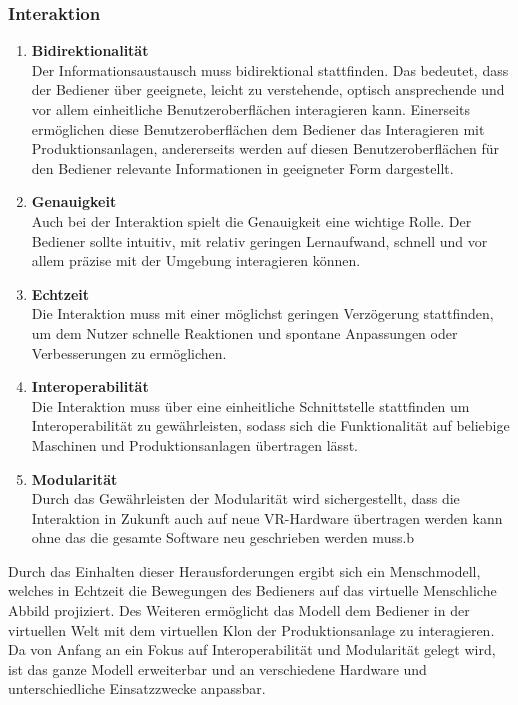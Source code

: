 \subsubsection{Interaktion}
\begin{enumerate}
	\item \textbf{Bidirektionalität} \\
	Der Informationsaustausch muss bidirektional stattfinden. Das bedeutet, dass der Bediener über geeignete, leicht zu verstehende, optisch ansprechende und vor allem einheitliche Benutzeroberflächen interagieren kann. Einerseits ermöglichen diese Benutzeroberflächen dem Bediener das Interagieren mit Produktionsanlagen, andererseits werden auf diesen Benutzeroberflächen für den Bediener relevante Informationen in geeigneter Form dargestellt.
	\item \textbf{Genauigkeit} \\
	Auch bei der Interaktion spielt die Genauigkeit eine wichtige Rolle. Der Bediener sollte intuitiv, mit relativ geringen Lernaufwand, schnell und vor allem präzise mit der Umgebung interagieren können.
	\item \textbf{Echtzeit} \\
	Die Interaktion muss mit einer möglichst geringen Verzögerung stattfinden, um dem Nutzer schnelle Reaktionen und spontane Anpassungen oder Verbesserungen zu ermöglichen.
	\item \textbf{Interoperabilität} \\
	Die Interaktion muss über eine einheitliche Schnittstelle stattfinden um Interoperabilität zu gewährleisten, sodass sich die Funktionalität auf beliebige Maschinen und Produktionsanlagen übertragen lässt.
	\item \textbf{Modularität} \\
	Durch das Gewährleisten der Modularität wird sichergestellt, dass die Interaktion in Zukunft auch auf neue VR-Hardware übertragen werden kann ohne das die gesamte Software neu geschrieben werden muss.b
\end{enumerate}
Durch das Einhalten dieser Herausforderungen ergibt sich ein Menschmodell, welches in Echtzeit die Bewegungen des Bedieners auf das virtuelle Menschliche Abbild projiziert. Des Weiteren ermöglicht das Modell dem Bediener in der virtuellen Welt mit dem virtuellen Klon der Produktionsanlage zu interagieren. Da von Anfang an ein Fokus auf Interoperabilität und Modularität gelegt wird, ist das ganze Modell erweiterbar und an verschiedene Hardware und unterschiedliche Einsatzzwecke anpassbar.

